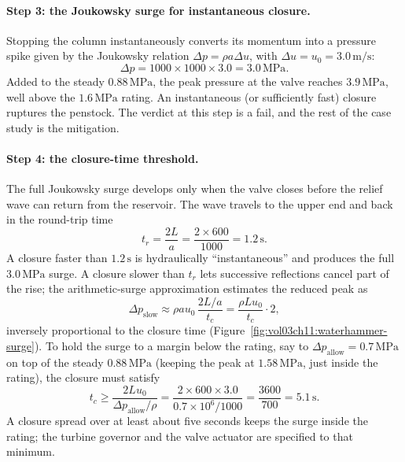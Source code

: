 \paragraph{Step 3: the Joukowsky surge for instantaneous closure.}
Stopping the column instantaneously converts its momentum into a
pressure spike given by the Joukowsky relation $\Delta p = \rho a
\Delta u$, with $\Delta u = u_0 = 3.0\,\si{\meter\per\second}$:
\[
\Delta p = 1000\times 1000\times 3.0 = 3.0\,\text{MPa}.
\]
Added to the steady $0.88\,\text{MPa}$, the peak pressure at the
valve reaches $3.9\,\text{MPa}$, well above the $1.6\,\text{MPa}$
rating. An instantaneous (or sufficiently fast) closure ruptures the
penstock. The verdict at this step is a fail, and the rest of the
case study is the mitigation.

\paragraph{Step 4: the closure-time threshold.} The full Joukowsky
surge develops only when the valve closes before the relief wave can
return from the reservoir. The wave travels to the upper end and back
in the round-trip time
\[
t_r = \frac{2L}{a} = \frac{2\times 600}{1000} = 1.2\,\si{\second}.
\]
A closure faster than $1.2\,\si{\second}$ is hydraulically
``instantaneous'' and produces the full $3.0\,\text{MPa}$ surge. A
closure slower than $t_r$ lets successive reflections cancel part of
the rise; the arithmetic-surge approximation estimates the reduced
peak as
\[
\Delta p_\text{slow} \approx \rho a u_0 \,\frac{2L/a}{t_c}
= \frac{\rho L u_0}{t_c}\cdot 2,
\]
inversely proportional to the closure time
(Figure~\ref{fig:vol03ch11:waterhammer-surge}). To hold the surge to
a margin below the rating, say to $\Delta p_\text{allow} =
0.7\,\text{MPa}$ on top of the steady $0.88\,\text{MPa}$ (keeping the
peak at $1.58\,\text{MPa}$, just inside the rating), the closure must
satisfy
\[
t_c \ge \frac{2L u_0}{\Delta p_\text{allow}/\rho}
= \frac{2\times 600\times 3.0}{0.7\times 10^6/1000}
= \frac{3600}{700} = 5.1\,\si{\second}.
\]
A closure spread over at least about five seconds keeps the surge
inside the rating; the turbine governor and the valve actuator are
specified to that minimum.



